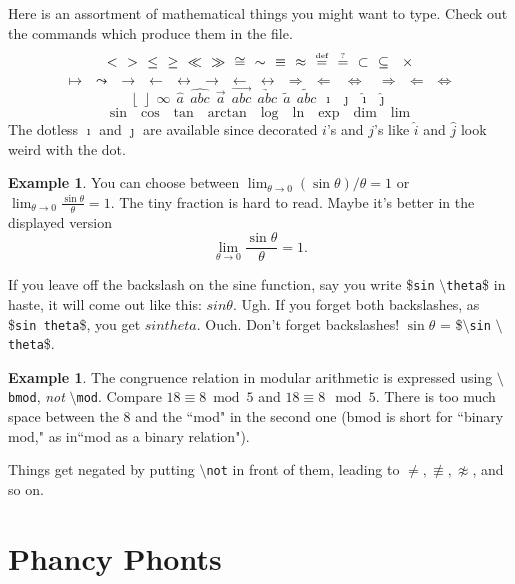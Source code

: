 \documentclass[12pt,letterpaper]{amsart}
\newcommand{\sm}{\setminus}
\newcommand{\pln}[1]{$\sm${\tt #1}}
\theoremstyle{plain}
\theoremstyle{definition}
\newtheorem{example}[theorem]{Example}
\numberwithin{equation}{section}
\begin{document}
Here is an assortment of mathematical things you might want to type. 
Check out the commands which produce them in the file. 
$$
< \ \  > \ \ \leq \ \ \geq \ \ \ll \ \ \gg \ \ 
\cong \ \ \sim \ \ \equiv \ \ \approx \ \ 
\stackrel{\text{\tiny def}}{=} \ \ 
\stackrel{\text{\tiny ?}}{=} \ \ 
\subset \ \ \subseteq \ \ \times  
$$
$$
\mapsto \ \ \leadsto \ \ 
\rightarrow \ \ \leftarrow \ \ 
\leftrightarrow \ \ 
\longrightarrow \ \ \longleftarrow \ \ \longleftrightarrow 
\ \ \Rightarrow \ \ \Leftarrow \ \ \ \Leftrightarrow \ \ 
\ \ \Longrightarrow \ \ \Longleftarrow \ \ \Longleftrightarrow  
$$
$$
\lfloor \ \  \rfloor \ \  
\infty \ \ 
\hat{a} \ \ \widehat{abc} \ \ 
\vec{a} \ \ \overrightarrow{abc} \ \ \underrightarrow{abc} \ \ 
\tilde{a} \ \ \widetilde{abc} \ \ 
\imath \ \ 
\jmath \ \ \hat{\imath} \ \ \hat{\jmath}
$$
$$
\sin \ \ \cos \ \ \tan \ \ \arctan \ \ \log \ \ \ln \ \ \exp \ \ \dim \ \ \lim
$$
The dotless $\imath$ and $\jmath$ are available since 
decorated $i$'s and $j$'s like $\hat{i}$ and $\hat{j}$ look 
weird with the dot.


\begin{example}
You can choose between 
$\lim_{\theta \rightarrow 0} (\sin \theta)/\theta = 1$ or 
$\lim_{\theta \rightarrow 0} \frac{\sin \theta}{\theta} = 1$. 
The tiny fraction is hard to read.  Maybe it's better 
in the displayed version
$$
\lim_{\theta \rightarrow 0} \frac{\sin \theta}{\theta} = 1.
$$
\end{example}

If you leave off the backslash on the sine function, 
say you write 
\${\tt sin} \pln{theta}\$ in haste, it 
will come out like this: $sin \theta$.  Ugh.  If you forget both 
backslashes, as \${\tt sin theta}\$, you get $sin theta$.  Ouch.
Don't forget backslashes! $\sin \theta$ = 
\$\pln{sin} \pln{theta}\$.


\begin{example}
The congruence relation in modular arithmetic is 
expressed using \pln{bmod}, {\it not} \pln{mod}. 
Compare $18 \equiv 8 \bmod 5$ and $18 \equiv 8 \mod 5$.
There is too much space between the 8 and the ``mod" in the second one 
(bmod is short for ``binary mod," as in``mod as a binary relation").
\end{example}


Things get negated by putting \pln{not} in front of them, leading to 
$\not=, \not\equiv, \not\approx$, and so on. 


\section{Phancy Phonts}\label{fontsec}
\end{document}

